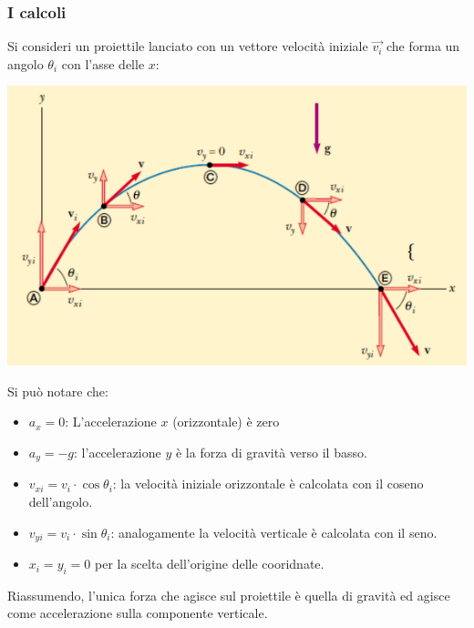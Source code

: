 \documentclass[12pt, a4paper, openany]{book}
\begin{document}
\subsubsection{I calcoli}
Si consideri un proiettile lanciato con un vettore velocità iniziale $\overrightarrow{v_i}$ che forma un angolo $\theta_i$ con l'asse delle $x$:
\begin{center}
    \includegraphics[width=\textwidth]{lez2slide19.png}
\end{center}
Si può notare che:
\begin{itemize}
    \item $a_x=0$: L'accelerazione $x$ (orizzontale) è zero
    \item $a_y= -g$: l'accelerazione $y$ è la forza di gravità verso il basso.
    \item $v_{xi} = v_i \cdot \cos \theta_i$: la velocità iniziale orizzontale è calcolata con il coseno dell'angolo.
    \item $v_{yi} = v_i \cdot \sin \theta_i$: analogamente la velocità verticale è calcolata con il seno.
    \item $x_i=y_i=0$ per la scelta dell'origine delle cooridnate.
\end{itemize}
Riassumendo, l'unica forza che agisce sul proiettile è quella di gravità ed agisce come accelerazione sulla componente verticale.
\end{document}
